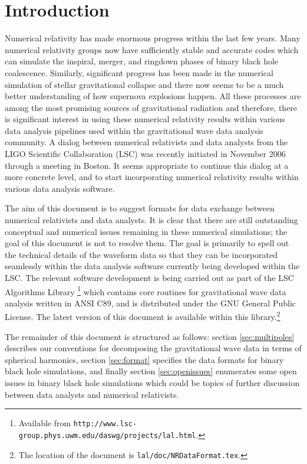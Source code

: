 \documentclass[prd,preprintnumbers,superscriptaddress,eqsecnum]{revtex4}
\numberwithin{equation}{section}
\begin{document}
\section{Introduction}
\label{sec:intro}

Numerical relativity has made enormous progress within the last few
years. Many numerical relativity groups now have sufficiently stable
and accurate codes which can simulate the inspiral, merger, and
ringdown phases of binary black hole coalescence. Similarly,
significant progress has been made in the numerical simulation of
stellar gravitational collapse and there now seems to be a much better
understanding of how supernova explosions happen. All these processes
are among the most promising sources of gravitational radiation and
therefore, there is significant interest in using these numerical
relativity results within various data analysis pipelines used within
the gravitational wave data analysis community. A dialog between
numerical relativists and data analysts from the LIGO Scientific
Collaboration (LSC) was recently initiated in November 2006 through a
meeting in Boston. It seems appropriate to continue this dialog at a
more concrete level, and to start incorporating numerical relativity
results within various data analysis software.

The aim of this document is to suggest formats for data exchange
between numerical relativists and data analysts. It is clear that
there are still outstanding conceptual and numerical issues remaining
in these numerical simulations; the goal of this document is not to
resolve them. The goal is primarily to spell out the technical
details of the waveform data so that they can be incorporated
seamlessly within the data analysis software currently being developed
within the LSC. The relevant software development is being carried
out as part of the LSC Algorithms Library \footnote{Available from
 \texttt{http://www.lsc-group.phys.uwm.edu/daswg/projects/lal.html}.}
which contains core routines for gravitational wave data analysis
written in ANSI C89, and is distributed under the GNU General Public
License. The latest version of this document is available within this
library.\footnote{The location of the document is
 \texttt{lal/doc/NRDataFormat.tex}.}
  
The remainder of this document is structured as follows: section
\ref{sec:multipoles} describes our conventions for decomposing the
gravitational wave data in terms of spherical harmonics, section
\ref{sec:format} specifies the data formats for binary black hole
simulations, and finally section \ref{sec:openissues} enumerates some
open issues in binary black hole simulations which could be topics of
further discussion between data analysts and numerical relativists.
\end{document}
